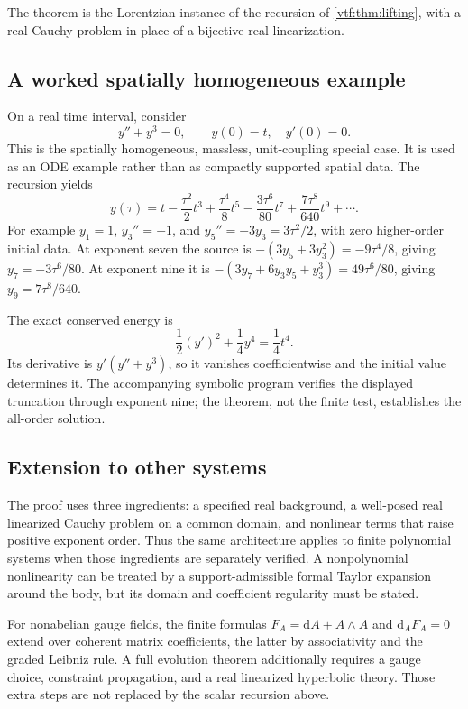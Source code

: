 \documentclass[11pt,letterpaper]{article}
\theoremstyle{definition}
\theoremstyle{remark}
\newcommand{\dd}{\mathrm d}
\begin{document}
The theorem is the Lorentzian instance of the recursion of
\cref{vtf:thm:lifting}, with a real Cauchy problem in place of a bijective real
linearization.

\subsection{A worked spatially homogeneous example}
On a real time interval, consider
\begin{equation}
 y''+y^3=0,\qquad y(0)=t,\quad y'(0)=0.
\end{equation}
This is the spatially homogeneous, massless, unit-coupling special case. It is used as an ODE example rather than as compactly supported spatial data. The recursion yields
\begin{equation}\label{vtf:mink:eq:cubicoscillator}
 y(\tau)=t-\frac{\tau^2}{2}t^3
 +\frac{\tau^4}{8}t^5
 -\frac{3\tau^6}{80}t^7
 +\frac{7\tau^8}{640}t^9+\cdots.
\end{equation}
For example $y_1=1$, $y_3''=-1$, and $y_5''=-3y_3=3\tau^2/2$, with zero higher-order initial data. At exponent seven the source is
$-(3y_5+3y_3^2)=-9\tau^4/8$, giving $y_7=-3\tau^6/80$. At exponent nine it is
$-(3y_7+6y_3y_5+y_3^3)=49\tau^6/80$, giving $y_9=7\tau^8/640$.

The exact conserved energy is
\begin{equation}
 \frac12(y')^2+\frac14y^4=\frac14t^4.
\end{equation}
Its derivative is $y'(y''+y^3)$, so it vanishes coefficientwise and the initial value determines it. The accompanying symbolic program verifies the displayed truncation through exponent nine; the theorem, not the finite test, establishes the all-order solution.

\subsection{Extension to other systems}
The proof uses three ingredients: a specified real background, a well-posed real linearized Cauchy problem on a common domain, and nonlinear terms that raise positive exponent order. Thus the same architecture applies to finite polynomial systems when those ingredients are separately verified. A nonpolynomial nonlinearity can be treated by a support-admissible formal Taylor expansion around the body, but its domain and coefficient regularity must be stated.

For nonabelian gauge fields, the finite formulas $F_A=\dd A+A\wedge A$ and $\dd_AF_A=0$ extend over coherent matrix coefficients, the latter by associativity and the graded Leibniz rule. A full evolution theorem additionally requires a gauge choice, constraint propagation, and a real linearized hyperbolic theory. Those extra steps are not replaced by the scalar recursion above.
\end{document}
